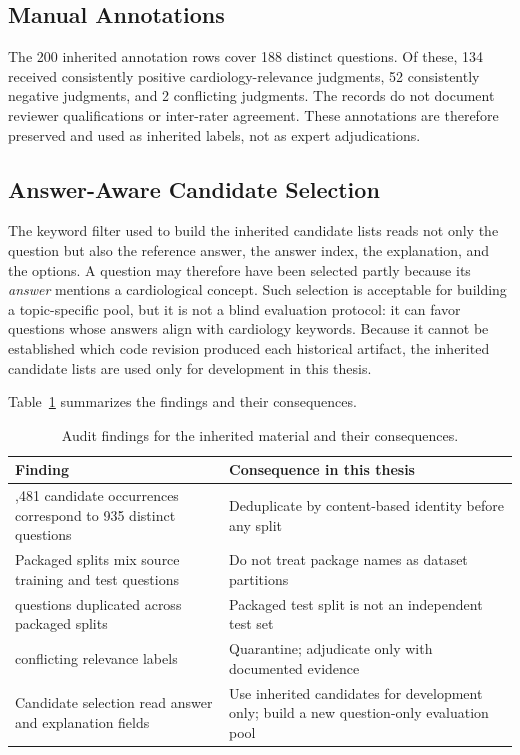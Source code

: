 \subsection{Manual Annotations}

The 200 inherited annotation rows cover 188 distinct questions. Of these, 134 received consistently positive cardiology-relevance judgments, 52 consistently negative judgments, and 2 conflicting judgments. The records do not document reviewer qualifications or inter-rater agreement. These annotations are therefore preserved and used as inherited labels, not as expert adjudications.

\subsection{Answer-Aware Candidate Selection}

The keyword filter used to build the inherited candidate lists reads not only the question but also the reference answer, the answer index, the explanation, and the options. A question may therefore have been selected partly because its \emph{answer} mentions a cardiological concept. Such selection is acceptable for building a topic-specific pool, but it is not a blind evaluation protocol: it can favor questions whose answers align with cardiology keywords. Because it cannot be established which code revision produced each historical artifact, the inherited candidate lists are used only for development in this thesis.

Table~\ref{tab:audit_summary} summarizes the findings and their consequences.

\begin{table}[H]
\centering
\caption{Audit findings for the inherited material and their consequences.}
\label{tab:audit_summary}
\begin{tabularx}{\linewidth}{>{\raggedright\arraybackslash}X >{\raggedright\arraybackslash}X}
\toprule
Finding & Consequence in this thesis \\
\midrule
1,481 candidate occurrences correspond to 935 distinct questions & Deduplicate by content-based identity before any split \\
Packaged splits mix source training and test questions & Do not treat package names as dataset partitions \\
12 questions duplicated across packaged splits & Packaged test split is not an independent test set \\
2 conflicting relevance labels & Quarantine; adjudicate only with documented evidence \\
Candidate selection read answer and explanation fields & Use inherited candidates for development only; build a new question-only evaluation pool \\
\bottomrule
\end{tabularx}
\end{table}

